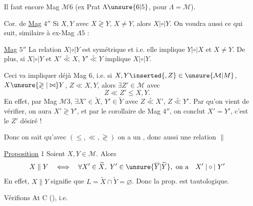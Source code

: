 Il faut encore  Mag $\mathcal M6$ (ex Prat $\Lambda\unsure{6|5}$, pour $\Lambda=\mathcal M$).

Cor. de \uline{Mag} $4''$ Si $X,Y$ avec $X\gtrless Y$, $X\ne Y$, alors $X\mathrel{|\circ|}Y$.
On voudra aussi ce qui suit, similaire à ex-Mag $\Lambda5$ :

\uline{Mag} $5''$ La relation $X\mathrel{|\circ|}Y$ est symétrique et  i.e. elle implique $Y\mathrel{|\circ|}X$ et $X\ne Y$. De plus, si $X\mathrel{|\circ|}Y$ et $X'\overset{\circ}{\ll}X$, $Y'\overset{\circ}{\ll}Y$ implique $X\mathrel{|\circ|}Y$.

Ceci va impliquer déjà Mag $6$, i.e. si $X,Y\inserted{,Z}\in\unsure{\mathcal M|M}$, $X\unsure{\gtrless|\bowtie}Y$, $Z\ll X,Y$, alors $\exists Z'\in\mathcal M$ avec
\[
Z\ll Z'\leq X,Y.
\]
En effet, par Mag $\mathcal M3$,  $\exists X'\in\widetilde X$, $Y'\in\widetilde Y$ avec $Z\overset{\circ}{\ll}X'$, $Z\overset{\circ}{\ll}Y'$. Par   qu'on vient de vérifier, on aura $X'\gtrless Y'$, et par le corollaire de Mag $4''$, on conclut $X'=Y'$, c'est le $Z'$ désiré !

Donc on sait qu'avec $(\leq,\ll,\gtrless)$ on a un ,  donc aussi une relation $\parallel$

\uline{Proposition} 1 Soient $X,Y\in\mathcal M$. Alors
\[
X\parallel Y\quad\Longleftrightarrow\quad\forall X'\in\widetilde X,\ Y'\in\unsure{\overline Y|\widetilde Y},\ \text{on a}\quad X'\mathrel{|\circ|}Y'
\]
En effet, $X\parallel Y$ signifie que  $L=\widetilde X\cap\widetilde Y=\varnothing$.  Donc la prop. est tautologique.

Vérifions At C (), i.e.

